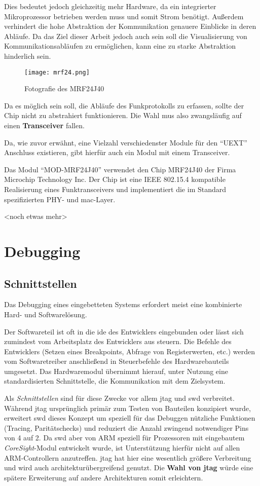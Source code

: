 Dies bedeutet jedoch gleichzeitig mehr Hardware, da ein integrierter
Mikroprozessor betrieben werden muss und somit Strom benötigt.
Außerdem verhindert die hohe Abstraktion der Kommunikation genauere Einblicke in
deren Abläufe. Da das Ziel dieser Arbeit jedoch auch sein soll die
Visualisierung von Kommunikationsabläufen zu ermöglichen, kann eine zu starke
Abstraktion hinderlich sein.

\begin{figure}[!ht]
\centering
\texttt{[image: mrf24.png]}\\
\caption{Fotografie des MRF24J40}{}
\end{figure}

Da es möglich sein soll, die Abläufe des Funkprotokolls zu erfassen, sollte der
Chip nicht zu abstrahiert funktionieren. Die Wahl mus also zwangsläufig auf
einen \textbf{Transceiver} fallen.

Da, wie zuvor erwähnt, eine Vielzahl verschiedenster Module für den "`UEXT"'
Anschluss existieren, gibt hierfür auch ein Modul mit einem Transceiver.

Das Modul "`MOD-MRF24J40"' verwendet den Chip MRF24J40 der Firma Microchip
Technology Inc. Der Chip ist eine IEEE 802.15.4\cite{IEEE01} kompatible
Realisierung eines Funktransceivers und implementiert die im Standard
spezifizierten PHY- und \gls{mac}-Layer.

<noch etwas mehr>
\section{Debugging}
\subsection{Schnittstellen}
Das Debugging eines eingebetteten Systems erfordert meist eine kombinierte Hard-
und Softwarelösung.

Der Softwareteil ist oft in die \gls{ide} des Entwicklers eingebunden oder lässt
sich zumindest vom Arbeitsplatz des Entwicklers aus steuern. Die Befehle des
Entwicklers (Setzen eines Breakpoints, Abfrage von Registerwerten, etc.) werden
vom Softwaretreiber anschließend in Steuerbefehle des Hardwarebauteils
umgesetzt. Das Hardwaremodul übernimmt hierauf, unter Nutzung eine
standardisierten Schnittstelle, die Kommunikation mit dem Zielsystem.

Als \emph{Schnittstellen} sind für diese Zwecke vor allem \gls{jtag} und
\gls{swd} verbreitet. Während \gls{jtag} ursprünglich primär zum Testen von Bauteilen
konzipiert wurde, erweitert \gls{swd} dieses Konzept um speziell für das
Debuggen nützliche Funktionen (Tracing, Paritätschecks) und reduziert die Anzahl
zwingend notwendiger Pins von 4 auf 2. Da \gls{swd} aber von
ARM speziell für Prozessoren mit eingebautem \emph{CoreSight}-Modul entwickelt
wurde, ist Unterstützung hierfür nicht auf allen ARM-Controllern anzutreffen. \gls{jtag}
hat hier eine wesentlich größere Verbreitung und wird auch
architekturübergreifend genutzt. Die \textbf{Wahl von \gls{jtag}} würde eine
spätere Erweiterung auf andere Architekturen somit erleichtern.
